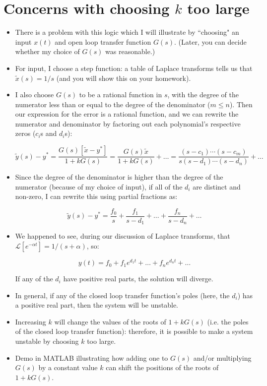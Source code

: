 \documentclass{article}
\newcommand{\Lapl}{\mathcal{L}}
\begin{document}
\section*{Concerns with choosing $k$ too large}
\begin{itemize}
\item There is a problem with this logic which I will illustrate by ``choosing" an input $x(t)$ and open loop transfer function $G(s)$. (Later, you can decide whether my choice of $G(s)$ was reasonable.)
\item For input, I choose a step function: a table of Laplace transforms tells us that $\tilde{x}(s) = 1/s$ (and you will show this on your homework).
\item I also choose $G(s)$ to be a rational function in $s$, with the degree of the numerator less than or equal to the degree of the denominator ($m \leq n$). Then our expression for the error is a rational function, and we can rewrite the numerator and denominator by factoring out each polynomial's respective zeros ($c_i$s and $d_i$s):

\[ \tilde{y}(s) - y^* = \frac{G(s) \left[ \tilde{x} - y^*  \right]}{1 + kG(s)} = \frac{G(s) \tilde{x}}{1 + kG(s)} + \ldots = \frac{\left( s - c_1 \right) \cdots \left( s - c_m \right) }{s \left( s - d_1 \right) \cdots \left( s - d_n \right)} + \ldots \]

\item Since the degree of the denominator is higher than the degree of the numerator (because of my choice of input), if all of the $d_i$ are distinct and non-zero, I can rewrite this using partial fractions as:

\[ \tilde{y}(s) - y^* = \frac{f_0}{s} + \frac{f_1}{s - d_1 } + \ldots + \frac{f_{n}}{s - d_n} + \ldots \]

\item We happened to see, during our discussion of Laplace transforms, that $\Lapl [e^{-\alpha t}] = 1/(s+ \alpha)$, so:

\[ y(t) = f_0 + f_1e^{d_1 t} + \ldots + f_{n} e^{d_n t}  + \ldots \]

If any of the $d_i$ have positive real parts, the solution will diverge.

\item In general, if any of the closed loop transfer function's poles (here, the $d_i$) has a positive real part, then the system will be unstable.

\item Increasing $k$ will change the values of the roots of $1 + kG(s)$ (i.e. the poles of the closed loop transfer function): therefore, it is possible to make a system unstable by choosing $k$ too large.

\item Demo in MATLAB illustrating how adding one to $G(s)$ and/or multiplying $G(s)$ by a constant value $k$ can shift the positions of the roots of $1 + kG(s)$.
\end{itemize}
\end{document}
